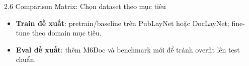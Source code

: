 \documentclass[aspectratio=1610,8pt]{beamer}
\begin{document}
\begin{frame}{2.6 \; Comparison Matrix: Chọn dataset theo mục tiêu}
    \scriptsize
    \begin{table}[]
        \centering
    \end{table}

    \vspace{0.3em}
    \begin{itemize}
        \item \textbf{Train đề xuất}: pretrain/baseline trên PubLayNet hoặc DocLayNet; fine-tune theo domain mục tiêu.
        \item \textbf{Eval đề xuất}: thêm M6Doc và benchmark mới để tránh overfit lên test chuẩn\cite{zhong2019publaynet,dla_benchmark_2022_sigkdd_2022_doclaynet_a_large_human_annotated_dataset_for_documen,dla_benchmark_2023_cvpr_2023_m6doc_a_large_scale_multi_format_multi_type_multi_layou,dla_2024_cvpr_2024_rodla_benchmarking_the_robustness_of_document_layout_analysis_mod,dla_2025_arxiv_led_benchmark_diagnosing_structural_layout_errors_for_document_layout,dla_2025_arxiv_sfdla_source_free_document_layout_analysis_pdf}.
    \end{itemize}
\end{frame}
\end{document}
